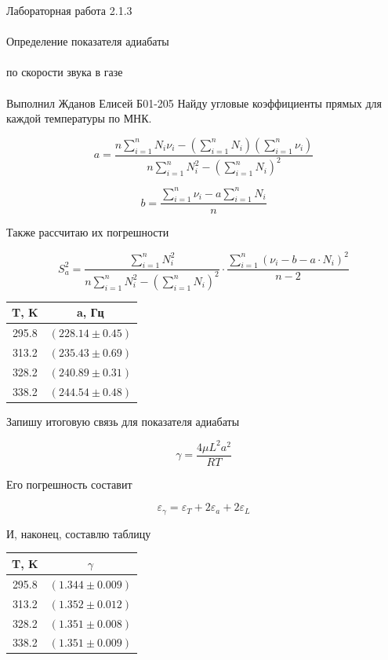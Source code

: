 \documentclass{astroedu-lab}
\begin{document}
\begin{problem}{\huge Лабораторная работа 2.1.3\\\\Определение показателя адиабаты\\\\по скорости звука в газе\\\\Выполнил Жданов Елисей Б01-205}
Найду угловые коэффициенты прямых для каждой температуры по МНК.

\[
	a = \frac{n \sum_{i=1}^n N_i \nu_i - \left( \sum_{i=1}^n N_i \right) \left( \sum_{i=1}^n \nu_i \right)}{n \sum_{i=1}^n N_i^2 - \left( \sum_{i=1}^n N_i \right)^2}
\]

\[
	b = \frac{\sum_{i=1}^n \nu_i - a \sum_{i=1}^n N_i}{n}
\]

Также рассчитаю их погрешности

\begin{equation}
	S_a^2 = \frac{\sum_{i=1}^n N_i^2}{n \sum_{i=1}^n N_i^2 - \left( \sum_{i=1}^n N_i \right)^2} \cdot \frac{\sum_{i=1}^n \left( \nu_i - b - a \cdot N_i \right)^2}{n - 2}
\end{equation}

\begin{center}
\begin{tabular}{|c|c|}
\hline T, K & a, Гц \\ \hline
295.8	& $(228.14 \pm 0.45)$ \\
313.2	& $(235.43 \pm 0.69)$ \\
328.2	& $(240.89 \pm 0.31)$ \\
338.2	& $(244.54 \pm 0.48)$ \\
\hline
\end{tabular}
\end{center}

Запишу итоговую связь для показателя адиабаты

\begin{equation}
	\boxed{\gamma = \frac{4 \mu L^2 a^2}{RT}}
\end{equation}

Его погрешность составит

\begin{equation}
	\varepsilon_\gamma = \varepsilon_T + 2 \varepsilon_a + 2 \varepsilon_L
\end{equation}

И, наконец, составлю таблицу

\begin{center}
\begin{tabular}{|c|c|}
\hline T, K & $\gamma$ \\ \hline
295.8	& $(1.344 \pm 0.009)$ \\
313.2	& $(1.352 \pm 0.012)$ \\
328.2	& $(1.351 \pm 0.008)$ \\
338.2	& $(1.351 \pm 0.009)$ \\
\hline
\end{tabular}
\end{center}


\end{problem}
\end{document}
